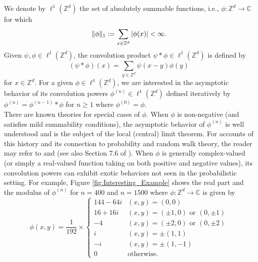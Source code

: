 \documentclass[11pt, letter]{book}
\begin{document}
\noindent We denote by $\ell^1(\mathbb{Z}^d)$ the set of absolutely summable functions, i.e., $\phi:\mathbb{Z}^d\to\mathbb{C}$ for which
\begin{equation*}
\|\phi\|_1:=\sum_{x\in\mathbb{Z}^d}\abs{\phi(x)}<\infty.
\end{equation*}
Given $\psi,\phi\in \ell^1(\mathbb{Z}^d)$, the convolution product $\psi\ast\phi\in\ell^1(\mathbb{Z}^d)$ is defined by
\begin{equation*}
\left(\psi\ast\phi\right)(x)=\sum_{y\in\mathbb{Z}^d}\psi(x-y)\phi(y)
\end{equation*}
for $x\in\mathbb{Z}^d$. For a given $\phi\in\ell^1(\mathbb{Z}^d)$, we are interested in the asymptotic behavior of its convolution powers $\phi^{(n)}\in\ell^1(\mathbb{Z}^d)$ defined iteratively by $\phi^{(n)}=\phi^{(n-1)}\ast\phi$ for $n\geq 1$ where $\phi^{(0)}=\phi$. \\


\noindent There are known theories for special cases of $\phi$. When $\phi$ is non-negative (and satisfies mild summability conditions), the asymptotic behavior of $\phi^{(n)}$ is well understood and is the subject of the local (central) limit theorem. For accounts of this history and its connection to probability and random walk theory, the reader may refer to \cite{lawler_random_2010} and \cite{spitzer_principles_1964} (see also Section 7.6 of \cite{randles_convolution_2017}). When $\phi$ is generally complex-valued (or simply a real-valued function taking on both positive and negative values), its convolution powers can exhibit exotic behaviors not seen in the probabilistic setting. For example, Figure \ref{fig:Interesting_Example} shows the real part and the modulus of $\phi^{(n)}$ for $n = 400$ and $n = 1500$ where $\phi: \mathbb{Z}^d \to \mathbb{C}$ is given by 
\begin{equation*}
    \phi(x,y) =
    \frac{1}{192}\times
    \begin{cases}
    144 - 64i &(x,y) = (0,0)\\
    16 + 16i &(x,y) = (\pm 1, 0)\mbox{ or }(0,\pm 1)\\
    -4        &(x,y) = (\pm 2,0)\mbox{ or }(0,\pm 2)\\
    i   &(x,y) = \pm(1,1)\\
    -i   &(x,y) = \pm(1,-1)\\
    0& \text{otherwise}.
    \end{cases}
\end{equation*}
\end{document}
